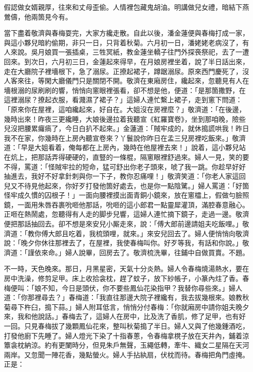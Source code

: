 \begin{myquote}
假認做女婿親厚，往來和丈母歪偷。人情裡包藏鬼胡油。明講做兒女禮，暗結下燕鶯儔，他兩箇見今有。
\end{myquote}

當下盡着敬濟與春梅耍完，大家方纔走散。自此以後，潘金蓮便與春梅打成一家，與這小夥兒暗約偷期，非只一日，只背着秋菊。六月初一日，潘姥姥老病沒了，有人來說。吳月娘買一張插桌，三牲冥紙，教金蓮坐轎子往門外探䘮祭祀，去了一遭回來。到次日，六月初三日，金蓮起來得早，在月娘房裡坐着，說了半日話出來，走在大廳院子裡墻根下，急了溺尿。正撩起裙子，蹲踞溺尿。原來西門慶死了，沒人客來往，等閑大廳儀門只是關閉不開。敬濟在東廂房住，纔起來，忽聽見有人在墻根溺的尿刷刷的響，悄悄向窻眼裡張看，卻不想是他，便道：「是那箇撒野，在這裡溺尿？撩起衣服，看濺濕了裙子？」這婦人連忙繫上裙子，走到窻下問道：「原來你在屋裡，這咱纔起來，好自在。大姐沒在房裡麼？」敬濟道：「在後邊，幾時出來！昨夜三更纔睡，大娘後邊拉着我聽宣《紅羅寶卷》，坐到那咱晚，險些兒沒把腰累㿚瘑了，今日白扒不起來。」{}金蓮道：「賊牢成的，就休搗謊哄我！昨日我不在家，你幾時在上房內聽宣卷來？丫鬟說你昨日在孟三兒房裡吃飯來。」{}敬濟道：「早是大姐看着，俺每都在上房內，幾時在他屋裡去來！」說着，這小夥兒站在炕上，把那話弄得硬硬的，直豎的一條棍，隔窻眼裡舒過來。{}婦人一見，笑的要不得，{}罵道：「怪賊牢拉的短命，猛可舒出你老子頭來，唬了我一跳。你趁早好好抽進去，我好不好拿針刺與你一下子，教你忍痛哩！」敬濟笑道：「你老人家這回兒又不待見他起來，你好歹打發他箇好處去，也是你一點陰騭。」{}婦人罵道：「好箇怪牢成久慣的囚根子！」一面向腰裡摸出面青銅小鏡來，放在窻櫺上，假做勻臉照鏡，一面用朱唇吞裹吮咂他那話，{}吮咂的這小郎君一點靈犀灌頂，滿腔春意融心。正咂在熱鬧處，忽聽得有人走的脚步兒響，這婦人連忙摘下鏡子，走過一邊。敬濟便把那話抽回去。卻不想是來安兒小厮走來，說：「傅大郎前邊請姐夫吃飯哩。」敬濟道：「教你傅大郎且吃着，我梳頭哩，就來。」來安兒回去了。婦人便悄悄向敬濟說：「晚夕你休往那裡去了，在屋裡，我使春梅叫你。好歹等我，有話和你說。」敬濟道：「謹依來命。」婦人說畢，回房去了。敬濟梳洗畢，往鋪中自做買賣。不題。

不一時，天色晚來。那日，月黑星密，天氣十分炎熱。婦人令春梅燒湯熱水，要在房中洗澡，修剪足甲。床上收拾衾枕，趕了蚊子，放下紗帳子，小篆內炷了香。春梅便叫：「娘不知，今日是頭伏，你不要些鳳仙花染指甲？我替你尋些來。」{}婦人道：「你那裡尋去？」春梅道：「我直往那邊大院子裡纔有，我去拔幾根來。娘教秋菊尋下杵臼，搗下蒜。」婦人附耳低言，悄悄分付春梅：「你就廂房中請你姐夫晚夕來，我和他說話。」春梅去了，這婦人在房中，比及洗了香肌，修了足甲，也有好一回。只見春梅拔了幾顆鳳仙花來，整叫秋菊搗了半日。婦人又與了他幾鍾酒吃，打發他廚下先睡了。婦人燈光下染了十指春蔥，令春梅拿櫈子放在天井內，鋪着涼簟衾枕納涼。約有更闌時分，但見朱戶無聲，玉繩低轉，牽牛、織女二星隔在天河兩岸。又忽聞一陣花香，幾點螢火。婦人手拈紈扇，伏枕而待。春梅把角門虛掩。正是：

